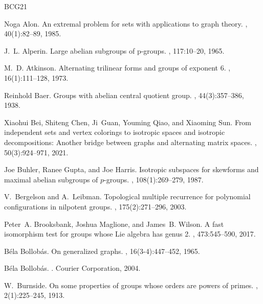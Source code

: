 \begin{thebibliography}{BCG{\etalchar{+}}21}
%

Noga Alon.
\newblock An extremal problem for sets with applications to graph theory.
, 40(1):82--89, 1985.

J.~L. Alperin.
\newblock Large abelian subgroups of p-groups.
, 117:10--20,
  1965.

M.~D. Atkinson.
\newblock Alternating trilinear forms and groups of exponent 6.
, 16(1):111--128,
  1973.

Reinhold Baer.
\newblock Groups with abelian central quotient group.
,
  44(3):357--386, 1938.

Xiaohui Bei, Shiteng Chen, Ji~Guan, Youming Qiao, and Xiaoming Sun.
\newblock From independent sets and vertex colorings to isotropic spaces and
  isotropic decompositions: Another bridge between graphs and alternating
  matrix spaces.
, 50(3):924--971, 2021.

Joe Buhler, Ranee Gupta, and Joe Harris.
\newblock Isotropic subspaces for skewforms and maximal abelian subgroups of
  $p$-groups.
, 108(1):269--279, 1987.

V.~Bergelson and A.~Leibman.
\newblock Topological multiple recurrence for polynomial configurations in
  nilpotent groups.
, 175(2):271--296, 2003.

Peter~A. Brooksbank, Joshua Maglione, and James~B. Wilson.
\newblock A fast isomorphism test for groups whose {Lie} algebra has genus 2.
, 473:545--590, 2017.

B{\'e}la Bollob{\'a}s.
\newblock On generalized graphs.
,
  16(3-4):447--452, 1965.

B{\'e}la Bollob{\'a}s.
.
\newblock Courier Corporation, 2004.

W.~Burnside.
\newblock On some properties of groups whose orders are powers of primes.
, 2(1):225--245,
  1913.


\end{thebibliography}
